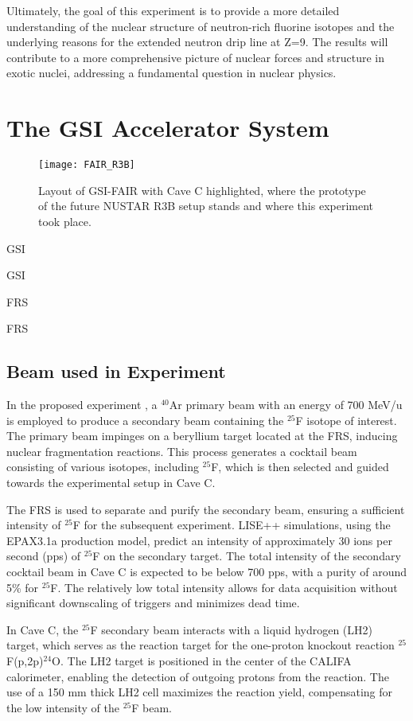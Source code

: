 Ultimately, the goal of this experiment is to provide a more detailed understanding of the nuclear structure of neutron-rich fluorine isotopes and the underlying reasons for the extended neutron drip line at Z=9. The results will contribute to a more comprehensive picture of nuclear forces and structure in exotic nuclei, addressing a fundamental question in nuclear physics.


\section{The GSI Accelerator System}

\begin{figure}
	\texttt{[image: FAIR\_R3B]}
	\caption{Layout of GSI-FAIR with Cave C highlighted, where the prototype of the future NUSTAR R3B setup stands and where this experiment took place.}
	\label{fig:GSI_FAIR_R3B}
\end{figure}

\gls{GSI}

\gls{GSI}

\gls{FRS}

\gls{FRS}

\subsection{Beam used in Experiment}

In the proposed experiment \cite{panin2024neutron}, a $^{40}$Ar primary beam with an energy of 700 MeV/u is employed to produce a secondary beam containing the $^{25}$F isotope of interest. The primary beam impinges on a beryllium target located at the \gls{FRS}, inducing nuclear fragmentation reactions. This process generates a cocktail beam consisting of various isotopes, including $^{25}$F, which is then selected and guided towards the experimental setup in Cave C.

The \gls{FRS} is used to separate and purify the secondary beam, ensuring a sufficient intensity of $^{25}$F for the subsequent experiment. LISE++ simulations, using the EPAX3.1a production model, predict an intensity of approximately 30 ions per second (pps) of $^{25}$F on the secondary target. The total intensity of the secondary cocktail beam in Cave C is expected to be below 700 pps, with a purity of around 5\% for $^25$F. The relatively low total intensity allows for data acquisition without significant downscaling of triggers and minimizes dead time.

In Cave C, the $^{25}$F secondary beam interacts with a liquid hydrogen (LH2) target, which serves as the reaction target for the one-proton knockout reaction $^{25}$F(p,2p)$^{24}$O. The LH2 target is positioned in the center of the CALIFA calorimeter, enabling the detection of outgoing protons from the reaction. The use of a 150 mm thick LH2 cell maximizes the reaction yield, compensating for the low intensity of the $^{25}$F beam.


